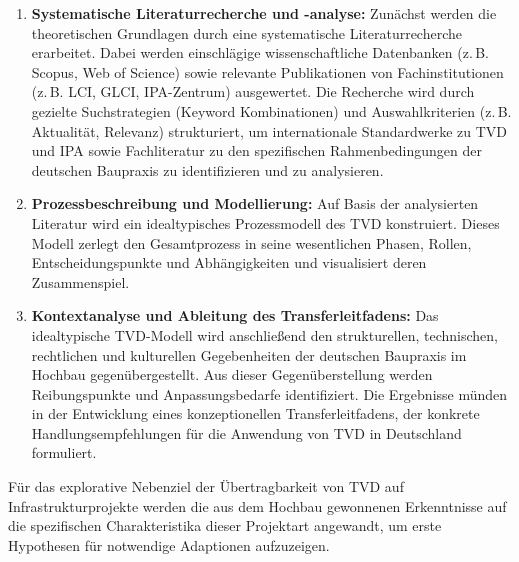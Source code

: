 \begin{enumerate}
    \item \textbf{Systematische Literaturrecherche und -analyse:} Zunächst werden die theoretischen Grundlagen durch eine systematische Literaturrecherche erarbeitet. Dabei werden einschlägige wissenschaftliche Datenbanken (z.\,B. Scopus, Web of Science) sowie relevante Publikationen von Fachinstitutionen (z.\,B. LCI, GLCI, IPA-Zentrum) ausgewertet. Die Recherche wird durch gezielte Suchstrategien (Keyword Kombinationen) und Auswahlkriterien (z.\,B. Aktualität, Relevanz) strukturiert, um internationale Standardwerke zu TVD und IPA sowie Fachliteratur zu den spezifischen Rahmenbedingungen der deutschen Baupraxis zu identifizieren und zu analysieren.
    
    \item \textbf{Prozessbeschreibung und Modellierung:} Auf Basis der analysierten Literatur wird ein idealtypisches Prozessmodell des TVD konstruiert. Dieses Modell zerlegt den Gesamtprozess in seine wesentlichen Phasen, Rollen, Entscheidungspunkte und Abhängigkeiten und visualisiert deren Zusammenspiel.
    
    \item \textbf{Kontextanalyse und Ableitung des Transferleitfadens:} Das idealtypische TVD-Modell wird anschließend den strukturellen, technischen, rechtlichen und kulturellen Gegebenheiten der deutschen Baupraxis im Hochbau gegenübergestellt. Aus dieser Gegenüberstellung werden Reibungspunkte und Anpassungsbedarfe identifiziert. Die Ergebnisse münden in der Entwicklung eines konzeptionellen Transferleitfadens, der konkrete Handlungsempfehlungen für die Anwendung von TVD in Deutschland formuliert.
\end{enumerate}

Für das explorative Nebenziel der Übertragbarkeit von TVD auf Infrastrukturprojekte werden die aus dem Hochbau gewonnenen Erkenntnisse auf die spezifischen Charakteristika dieser Projektart angewandt, um erste Hypothesen für notwendige Adaptionen aufzuzeigen.